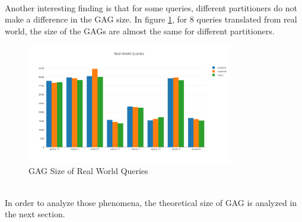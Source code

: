 \\Another interesting finding is that for some queries, different partitioners do not make a difference in the GAG size. In figure \ref{fig:alibaba-Real-World-Queries}, for 8 queries translated from real world, the size of the GAGs are almost the same for different partitioners.
\begin{figure}[h!]
  \caption{GAG Size of Real World Queries}
  \label{fig:alibaba-Real-World-Queries}
  \centering
    \includegraphics[width=0.8\textwidth]{img/alibaba-Real-World-Queries}
\end{figure}
\\In order to analyze those phenomena, the theoretical size of GAG is analyzed in the next section.
